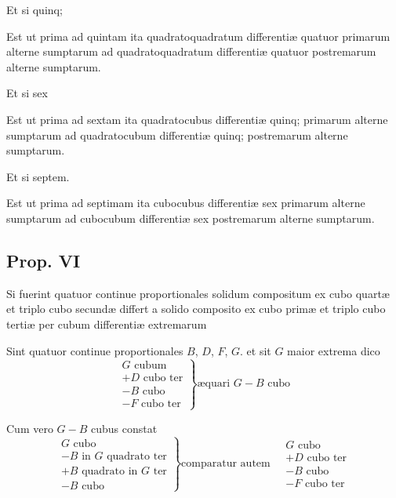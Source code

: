 \documentclass[11pt,a4paper]{article}
\begin{document}
Et si quinq;

Est ut prima ad quintam ita quadratoquadratum differentiæ quatuor primarum alterne sumptarum ad quadratoquadratum differentiæ quatuor postremarum alterne sumptarum.

Et si sex

Est ut prima ad sextam ita quadratocubus differentiæ quinq; primarum alterne sumptarum ad quadratocubum differentiæ quinq; postremarum alterne sumptarum.

Et si septem.

Est ut prima ad septimam ita cubocubus differentiæ sex primarum alterne sumptarum ad cubocubum differentiæ sex postremarum alterne sumptarum.

\subsection*{Prop. VI}

Si fuerint quatuor continue proportionales solidum compositum ex cubo quartæ et triplo cubo secundæ differt a solido composito ex cubo primæ et triplo cubo tertiæ per cubum differentiæ extremarum


Sint quatuor continue proportionales $B$, $D$, $F$, $G$. et sit $G$ maior extrema dico
\[ \left.\begin{array}{l} G \text{ cubum} \\ + D \text{ cubo ter} \\ - B \text{ cubo} \\ - F \text{ cubo ter} \end{array}\right\} \text{æquari } G - B \text{ cubo} \]

Cum vero $G - B$ cubus constat
\[ \left.\begin{array}{l} G \text{ cubo} \\ - B \text{ in } G \text{ quadrato ter} \\ + B \text{ quadrato in } G \text{ ter} \\ - B \text{ cubo} \end{array}\right\} \text{comparatur autem} \quad \begin{array}{l} G \text{ cubo} \\ + D \text{ cubo ter} \\ - B \text{ cubo} \\ - F \text{ cubo ter} \end{array} \]
\end{document}
